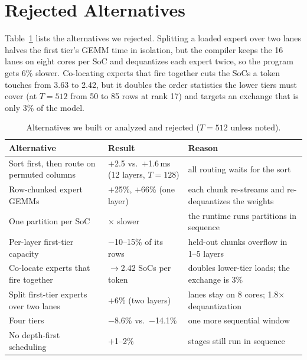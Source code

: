 \section{Rejected Alternatives}
\label{app:neg}
\label{sec:eval-neg}

Table~\ref{tab:neg} lists the alternatives we rejected. Splitting a loaded expert over two
lanes halves the first tier's GEMM time in isolation, but the compiler keeps the 16 lanes on eight cores per SoC and
dequantizes each expert twice, so the program gets 6\% slower. Co-locating experts that fire together cuts the SoCs a
token touches from 3.63 to 2.42, but it doubles the order statistics the lower tiers must cover (at $T=512$ from 50 to 85
rows at rank 17) and targets an exchange that is only 3\% of the model.


\begin{table}[H]
\caption{Alternatives we built or analyzed and rejected ($T=512$ unless noted).}
\label{tab:neg}
\vskip 0.1in
\begin{center}
\begin{footnotesize}
\setlength{\tabcolsep}{3pt}
\begin{tabular}{@{}>{\raggedright\arraybackslash}p{}>{\raggedright\arraybackslash}p{}>{\raggedright\arraybackslash}p{}@{}}
\toprule
Alternative & Result & Reason \\
\midrule
Sort first, then route on permuted columns & $+$2.5 vs.\ $+$1.6\,ms (12 layers, $T{=}128$) & all routing waits for the sort \\
Row-chunked expert GEMMs & $+$25\%, $+$66\% (one layer) & each chunk re-streams and re-dequantizes the weights \\
One partition per SoC & 1.7$\times$ slower & the runtime runs partitions in sequence \\
Per-layer first-tier capacity & $-$10--15\% of its rows & held-out chunks overflow in 1--5 layers \\
Co-locate experts that fire together & 3.63$\to$2.42 SoCs per token & doubles lower-tier loads; the exchange is 3\% \\
Split first-tier experts over two lanes & $+$6\% (two layers) & 16 lanes stay on 8 cores; 1.8$\times$ dequantization \\
Four tiers & $-$8.6\% vs.\ $-$14.1\% & one more sequential window \\
No depth-first scheduling & $+$1--2\% & stages still run in sequence \\
\bottomrule
\end{tabular}
\end{footnotesize}
\end{center}
\vskip -0.15in
\end{table}
